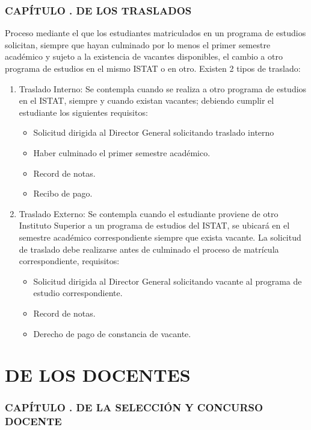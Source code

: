 \section{CAPÍTULO . DE LOS TRASLADOS}
\addtocounter{re}{1}
Proceso mediante el que los estudiantes matriculados en un programa de estudios solicitan, siempre que hayan culminado por lo menos el primer semestre académico y sujeto a la existencia de vacantes disponibles, el cambio a otro programa de estudios en el mismo ISTAT o en otro. Existen 2 tipos de traslado: 
\begin{enumerate}
\item Traslado Interno: Se contempla cuando se realiza a otro programa de estudios en el ISTAT, siempre y cuando existan vacantes; debiendo cumplir el estudiante los siguientes requisitos: 
	\begin{itemize}
		\item Solicitud dirigida al Director General solicitando traslado interno 
		\item Haber culminado el primer semestre académico. 
		\item Record de notas.
		\item Recibo de pago. 
	\end{itemize}

\item Traslado Externo: Se contempla cuando el estudiante proviene de otro Instituto Superior a un programa de estudios del ISTAT, se ubicará en el semestre académico correspondiente siempre que exista vacante. La solicitud de traslado debe realizarse antes de culminado el proceso de matrícula correspondiente, requisitos: 
	\begin{itemize}
		\item Solicitud dirigida al Director General solicitando vacante al programa de estudio correspondiente. 
		\item Record de notas. 
		\item Derecho de pago de constancia de vacante.
	\end{itemize}
\end{enumerate}
\part{DE LOS DOCENTES}
\section{CAPÍTULO . DE LA SELECCIÓN Y CONCURSO DOCENTE}
\addtocounter{re}{1}

